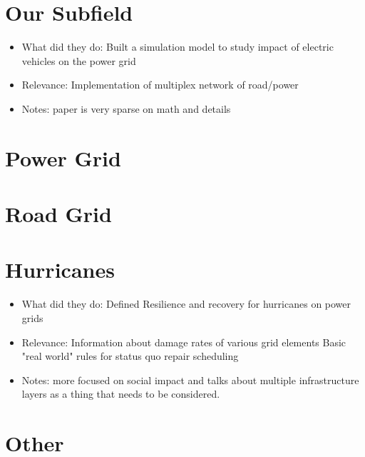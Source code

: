 \documentclass{article}
\begin{document}
	
	\section{Our Subfield}
	\cite{YangEA2018}
	\begin{itemize}
		\item What did they do: \newline
		Built a simulation model to study impact of electric vehicles on the power grid
		\item Relevance: \newline
		Implementation of multiplex network of road/power 
		\item Notes: \newline
		paper is very sparse on math and details 
	\end{itemize}
	
	\section{Power Grid}
	
	\section{Road Grid}
	
	\section{Hurricanes}
	\cite{OuyangEA2014}
	\begin{itemize}
	\item What did they do: \newline
	Defined Resilience and recovery for hurricanes on power grids
	\item Relevance: \newline
	Information about damage rates of various grid elements \newline
	Basic "real world" rules for status quo repair scheduling 
	\item Notes: \newline
	more focused on social impact and talks about multiple infrastructure layers as a thing that needs to be considered.
	\end{itemize}
	\section{Other}
	
	
	
\end{document}
